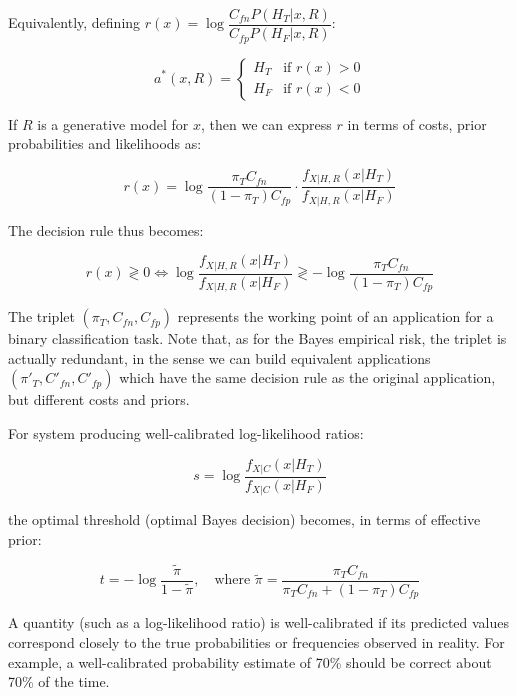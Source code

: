 Equivalently, defining $r(x) = \log\dfrac{C_{fn}P(H_T|x,R)}{C_{fp}P(H_F|x,R)}$:

\begin{equation*}
a^*(x, R) = \begin{cases}
H_T & \text{if } r(x) > 0 \\
H_F & \text{if } r(x) < 0
\end{cases}
\end{equation*}

If $R$ is a generative model for $x$, then we can express $r$ in terms of costs, prior probabilities and likelihoods as:

\begin{equation*}
r(x) = \log \frac{\pi_T C_{fn}}{(1-\pi_T)C_{fp}} \cdot \frac{f_{X|H,R}(x|H_T)}{f_{X|H,R}(x|H_F)}
\end{equation*}

The decision rule thus becomes:

\begin{equation*}
r(x) \gtrless 0 \iff \log \frac{f_{X|H,R}(x|H_T)}{f_{X|H,R}(x|H_F)} \gtrless -\log \frac{\pi_T C_{fn}}{(1-\pi_T)C_{fp}}
\end{equation*}

The triplet $(\pi_T, C_{fn}, C_{fp})$ represents the working point of an application for a binary classification task. Note that, as for the Bayes empirical risk, the triplet is actually redundant, in the sense we can build equivalent applications $(\pi'_T, C'_{fn}, C'_{fp})$ which have the same decision rule as the original application, but different costs and priors.

For system producing well-calibrated log-likelihood ratios:

\begin{equation*}
s = \log \frac{f_{X|C}(x|H_T)}{f_{X|C}(x|H_F)}
\end{equation*}

the optimal threshold (optimal Bayes decision) becomes, in terms of effective prior:

\begin{equation*}
t = -\log \frac{\tilde{\pi}}{1-\tilde{\pi}}, \quad \text{where } \tilde{\pi} = \frac{\pi_T C_{fn}}{\pi_T C_{fn} + (1-\pi_T)C_{fp}}
\end{equation*}

A quantity (such as a log-likelihood ratio) is well-calibrated if its predicted values correspond closely to the true probabilities or frequencies observed in reality. For example, a well-calibrated probability estimate of 70\% should be correct about 70\% of the time.

